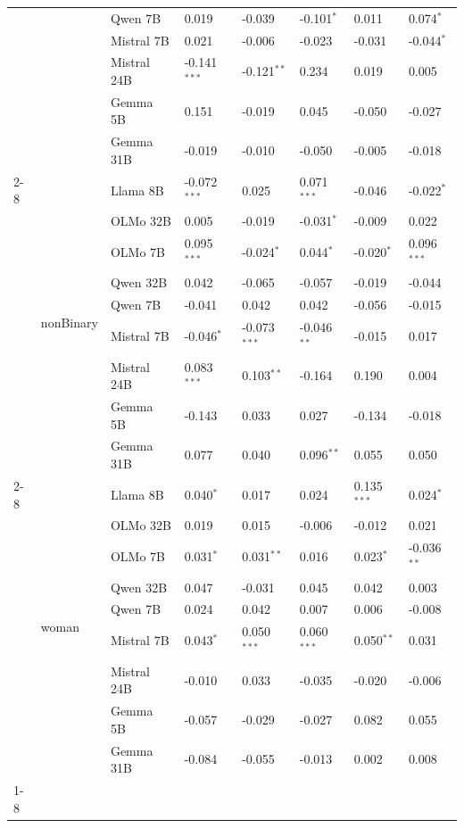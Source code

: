 \begin{longtable}[t]{llllllll}
 &  & Qwen 7B & 0.019 & -0.039 & -0.101$^{*}$ & 0.011 & 0.074$^{*}$ \\
 &  & Mistral 7B & 0.021 & -0.006 & -0.023 & -0.031 & -0.044$^{*}$ \\
 &  & Mistral 24B & -0.141$^{***}$ & -0.121$^{**}$ & 0.234 & 0.019 & 0.005 \\
 &  & Gemma 5B & 0.151 & -0.019 & 0.045 & -0.050 & -0.027 \\
 &  & Gemma 31B & -0.019 & -0.010 & -0.050 & -0.005 & -0.018 \\
\cline{2-8}
 & \multirow[t]{9}{*}{nonBinary} & Llama 8B & -0.072$^{***}$ & 0.025 & 0.071$^{***}$ & -0.046 & -0.022$^{*}$ \\
 &  & OLMo 32B & 0.005 & -0.019 & -0.031$^{*}$ & -0.009 & 0.022 \\
 &  & OLMo 7B & 0.095$^{***}$ & -0.024$^{*}$ & 0.044$^{*}$ & -0.020$^{*}$ & 0.096$^{***}$ \\
 &  & Qwen 32B & 0.042 & -0.065 & -0.057 & -0.019 & -0.044 \\
 &  & Qwen 7B & -0.041 & 0.042 & 0.042 & -0.056 & -0.015 \\
 &  & Mistral 7B & -0.046$^{*}$ & -0.073$^{***}$ & -0.046$^{**}$ & -0.015 & 0.017 \\
 &  & Mistral 24B & 0.083$^{***}$ & 0.103$^{**}$ & -0.164 & 0.190 & 0.004 \\
 &  & Gemma 5B & -0.143 & 0.033 & 0.027 & -0.134 & -0.018 \\
 &  & Gemma 31B & 0.077 & 0.040 & 0.096$^{**}$ & 0.055 & 0.050 \\
\cline{2-8}
 & \multirow[t]{9}{*}{woman} & Llama 8B & 0.040$^{*}$ & 0.017 & 0.024 & 0.135$^{***}$ & 0.024$^{*}$ \\
 &  & OLMo 32B & 0.019 & 0.015 & -0.006 & -0.012 & 0.021 \\
 &  & OLMo 7B & 0.031$^{*}$ & 0.031$^{**}$ & 0.016 & 0.023$^{*}$ & -0.036$^{**}$ \\
 &  & Qwen 32B & 0.047 & -0.031 & 0.045 & 0.042 & 0.003 \\
 &  & Qwen 7B & 0.024 & 0.042 & 0.007 & 0.006 & -0.008 \\
 &  & Mistral 7B & 0.043$^{*}$ & 0.050$^{***}$ & 0.060$^{***}$ & 0.050$^{**}$ & 0.031 \\
 &  & Mistral 24B & -0.010 & 0.033 & -0.035 & -0.020 & -0.006 \\
 &  & Gemma 5B & -0.057 & -0.029 & -0.027 & 0.082 & 0.055 \\
 &  & Gemma 31B & -0.084 & -0.055 & -0.013 & 0.002 & 0.008 \\
\cline{1-8} \cline{2-8}
\end{longtable}
